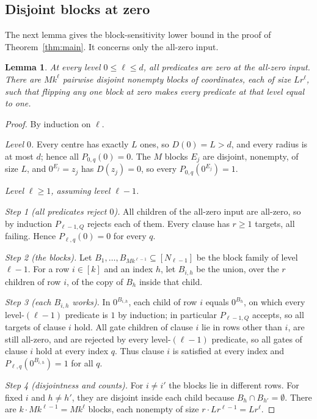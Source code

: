\documentclass[11pt]{article}
\newtheorem{lemma}[theorem]{Lemma}
\theoremstyle{definition}
\theoremstyle{remark}
\begin{document}
\subsection{Disjoint blocks at zero}

The next lemma gives the block-sensitivity lower bound in the proof of
Theorem~\ref{thm:main}. It concerns only the all-zero input.

\begin{lemma}\label{lem:blocks}
At every level \(0\le\ell\le d\), all predicates are zero at the
all-zero input. There are \(Mk^\ell\) pairwise disjoint nonempty blocks
of coordinates, each of size \(Lr^\ell\), such that flipping any one
block at zero makes every predicate at that level equal to one.
\end{lemma}
\begin{proof}
By induction on \(\ell\).

\emph{Level \(0\).} Every centre has exactly \(L\) ones, so \(D(0)=L>d\),
and every radius is at most \(d\); hence all \(P_{0,q}(0)=0\). The \(M\)
blocks \(E_j\) are disjoint, nonempty, of size \(L\), and \(0^{E_j}=z_j\) has
\(D(z_j)=0\), so every \(P_{0,q}(0^{E_j})=1\).

\emph{Level \(\ell\ge1\), assuming level \(\ell-1\).}

\emph{Step 1 (all predicates reject \(0\)).} All children of the all-zero
input are all-zero, so by induction \(P_{\ell-1,Q}\) rejects each of them.
Every clause has \(r\ge1\) targets, all failing. Hence
\(P_{\ell,q}(0)=0\) for every \(q\).

\emph{Step 2 (the blocks).} Let \(B_1,\ldots,B_{Mk^{\ell-1}}\subseteq
[N_{\ell-1}]\) be the block family of level \(\ell-1\). For a row \(i\in[k]\)
and an index \(h\), let \(B_{i,h}\) be the union, over the \(r\) children of
row \(i\), of the copy of \(B_h\) inside that child.

\emph{Step 3 (each \(B_{i,h}\) works).} In \(0^{B_{i,h}}\), each child of row
\(i\) equals \(0^{B_h}\), on which every level-\((\ell-1)\) predicate is
\(1\) by induction; in particular \(P_{\ell-1,Q}\) accepts, so all targets
of clause \(i\) hold. All gate children of clause \(i\) lie in rows other
than \(i\), are still all-zero, and are rejected by every
level-\((\ell-1)\) predicate, so all gates of clause \(i\) hold at every
index \(q\). Thus clause \(i\) is satisfied at every index and
\(P_{\ell,q}(0^{B_{i,h}})=1\) for all \(q\).

\emph{Step 4 (disjointness and counts).} For \(i\ne i'\) the blocks lie in
different rows. For fixed \(i\) and \(h\ne h'\), they are disjoint inside
each child because \(B_h\cap B_{h'}=\emptyset\). There are
\(k\cdot Mk^{\ell-1}=Mk^\ell\) blocks, each nonempty of size
\(r\cdot Lr^{\ell-1}=Lr^\ell\).
\end{proof}
\end{document}
